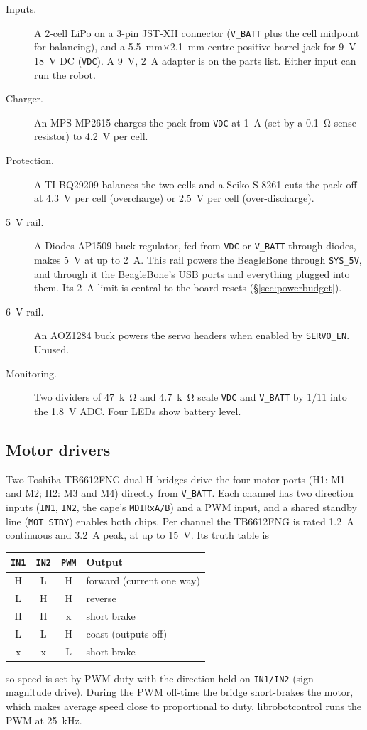 \begin{description}
\item[Inputs.] A 2-cell LiPo on a 3-pin JST-XH connector (\texttt{V\_BATT}
  plus the cell midpoint for balancing), and a \SI{5.5}{mm}$\times$\SI{2.1}{mm} centre-positive
  barrel jack for \SIrange{9}{18}{V} DC (\texttt{VDC}). A \SI{9}{V}, \SI{2}{A}
  adapter is on the parts list. Either input can run the robot.
\item[Charger.] An MPS MP2615 charges the pack from \texttt{VDC} at \SI{1}{A}
  (set by a \SI{0.1}{\ohm} sense resistor) to \SI{4.2}{V} per cell.
\item[Protection.] A TI BQ29209 balances the two cells and a Seiko S-8261
  cuts the pack off at \SI{4.3}{V} per cell (overcharge) or \SI{2.5}{V} per
  cell (over-discharge).
\item[\SI{5}{V} rail.] A Diodes AP1509 buck regulator, fed from \texttt{VDC} or
  \texttt{V\_BATT} through diodes, makes \SI{5}{V} at up to \SI{2}{A}. This
  rail powers the BeagleBone through \texttt{SYS\_5V}, and through it the
  BeagleBone's USB ports and everything plugged into them. Its \SI{2}{A} limit
  is central to the board resets (\S\ref{sec:powerbudget}).
\item[\SI{6}{V} rail.] An AOZ1284 buck powers the servo headers when enabled
  by \texttt{SERVO\_EN}. Unused.
\item[Monitoring.] Two dividers of \SI{47}{k\ohm} and \SI{4.7}{k\ohm} scale
  \texttt{VDC} and \texttt{V\_BATT} by $1/11$ into the \SI{1.8}{V} ADC.
  Four LEDs show battery level.
\end{description}

\subsection{Motor drivers}

Two Toshiba TB6612FNG dual H-bridges drive the four motor ports (H1: M1 and
M2; H2: M3 and M4) directly from \texttt{V\_BATT}. Each channel has two
direction inputs (\texttt{IN1}, \texttt{IN2}, the cape's \texttt{MDIRxA/B})
and a PWM input, and a shared standby line (\texttt{MOT\_STBY}) enables both
chips. Per channel the TB6612FNG is rated \SI{1.2}{A} continuous and
\SI{3.2}{A} peak, at up to \SI{15}{V}. Its truth table is
\begin{center}
\small
\begin{tabular}{cccl}
\toprule
\texttt{IN1} & \texttt{IN2} & \texttt{PWM} & Output \\
\midrule
H & L & H & forward (current one way) \\
L & H & H & reverse \\
H & H & x & short brake \\
L & L & H & coast (outputs off) \\
x & x & L & short brake \\
\bottomrule
\end{tabular}
\end{center}
so speed is set by PWM duty with the direction held on \texttt{IN1/IN2}
(sign--magnitude drive). During the PWM off-time the bridge short-brakes the
motor, which makes average speed close to proportional to duty.
librobotcontrol runs the PWM at \SI{25}{kHz}.

